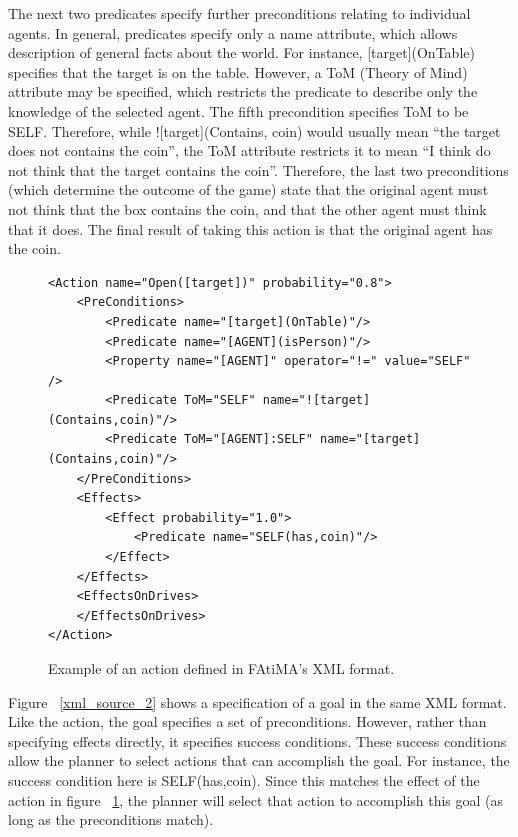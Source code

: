 \documentclass{article}
\begin{document}
The next two predicates specify further preconditions relating to individual
agents.  In general, predicates specify only a name attribute, which allows
description of general facts about the world.  For instance, [target](OnTable)
specifies that the target is on the table.  However, a ToM (Theory of Mind)
attribute may be specified, which restricts the predicate to describe only
the knowledge of the selected agent.  The fifth precondition specifies ToM
to be SELF.  Therefore, while ![target](Contains, coin) would usually mean
``the target does not contains the coin'', the ToM attribute restricts it to mean
``I think do not think that the target contains the coin''.  Therefore, the
last two preconditions (which determine the outcome of the game) state that
the original agent must not think that the box contains the coin, and that
the other agent must think that it does.  The final result of taking this
action is that the original agent has the coin.


\begin{figure}[hb]
\lstset{language=XML}
\begin{lstlisting}
<Action name="Open([target])" probability="0.8">
	<PreConditions>
		<Predicate name="[target](OnTable)"/>
		<Predicate name="[AGENT](isPerson)"/>
		<Property name="[AGENT]" operator="!=" value="SELF" />
		<Predicate ToM="SELF" name="![target](Contains,coin)"/>
		<Predicate ToM="[AGENT]:SELF" name="[target](Contains,coin)"/>
	</PreConditions>
	<Effects>
		<Effect probability="1.0">
			<Predicate name="SELF(has,coin)"/>
		</Effect>
	</Effects> 
	<EffectsOnDrives>
	</EffectsOnDrives>
</Action>
\end{lstlisting}
\caption{Example of an action defined in FAtiMA's XML format.}
\label{xml_source_1}
\end{figure}

Figure ~\ref{xml_source_2} shows a specification of a goal in the same XML
format.  Like the action, the goal specifies a set of preconditions.  However,
rather than specifying effects directly, it specifies success conditions.
These success conditions allow the planner to select actions that can accomplish
the goal.  For instance, the success condition here is SELF(has,coin).  Since
this matches the effect of the action in figure ~\ref{xml_source_1}, the planner
will select that action to accomplish this goal (as long as the preconditions match).
\end{document}
